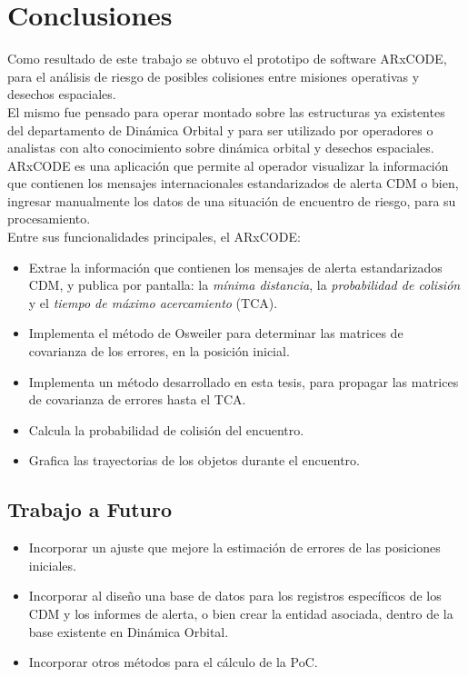  \chapter{Conclusiones}
\label{chap:conclusiones}

Como resultado de este trabajo se obtuvo el prototipo de software ARxCODE, para el an\'alisis de riesgo de posibles colisiones entre misiones operativas y desechos espaciales.\\
El mismo fue pensado para operar montado sobre las estructuras ya existentes del departamento de Din\'amica Orbital y para ser utilizado por operadores o analistas con alto conocimiento sobre din\'amica orbital y desechos espaciales.\\

ARxCODE es una aplicaci\'on que permite al operador visualizar la informaci\'on que contienen los mensajes internacionales estandarizados de alerta \ac{CDM} o bien, ingresar manualmente los datos de una situaci\'on de encuentro de riesgo, para su procesamiento.\\

Entre sus funcionalidades principales, el ARxCODE:\\

\begin{itemize}
 \item Extrae la informaci\'on que contienen los mensajes de alerta estandarizados CDM, y publica por pantalla: la {\it{m\'inima distancia}}, la {\it{probabilidad de colisi\'on}} y el {\it{tiempo de m\'aximo acercamiento}} (TCA). 
 \item Implementa el m\'etodo de Osweiler \cite{osweiler} para determinar las matrices de covarianza de los errores, en la posici\'on inicial.
 \item Implementa un m\'etodo desarrollado en esta tesis, para propagar las matrices de covarianza de errores hasta el TCA.
 \item Calcula la probabilidad de colisi\'on del encuentro.
 \item Grafica las trayectorias de los objetos durante el encuentro.
\end{itemize}

\section*{Trabajo a Futuro}

\begin{itemize}
 \item Incorporar un ajuste que mejore la estimaci\'on de errores de las posiciones iniciales. 
 \item Incorporar al dise\~no una base de datos para los registros espec\'ificos de los CDM y los informes de alerta, o bien 
 crear la entidad asociada, dentro de la base existente en Din\'amica Orbital.
 \item Incorporar otros m\'etodos para el c\'alculo de la PoC.
\end{itemize}


\endinput